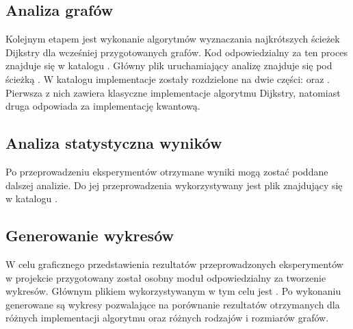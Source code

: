 \subsection{Analiza grafów}

Kolejnym etapem jest wykonanie algorytmów wyznaczania najkrótszych ścieżek Dijkstry dla wcześniej przygotowanych grafów. Kod odpowiedzialny za ten proces znajduje się w katalogu . Główny plik uruchamiający analizę znajduje się pod ścieżką . W katalogu  implementacje zostały rozdzielone na dwie części:  oraz . Pierwsza z nich zawiera klasyczne implementacje algorytmu Dijkstry, natomiast druga odpowiada za implementację kwantową.

\subsection{Analiza statystyczna wyników}

Po przeprowadzeniu eksperymentów otrzymane wyniki mogą zostać poddane dalszej analizie. Do jej przeprowadzenia wykorzystywany jest plik  znajdujący się w katalogu .

\subsection{Generowanie wykresów}

W celu graficznego przedstawienia rezultatów przeprowadzonych eksperymentów w projekcie przygotowany został osobny moduł odpowiedzialny za tworzenie wykresów. Głównym plikiem wykorzystywanym w tym celu jest . Po wykonaniu generowane są wykresy pozwalające na porównanie rezultatów otrzymanych dla różnych implementacji algorytmu oraz różnych rodzajów i rozmiarów grafów. 


